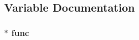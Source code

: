 \subsection{Variable Documentation}
\subsubsection[{\texorpdfstring{func}{func}}]{$\ast$ func}\hypertarget{group__apr__signal_gad33414172438284c8aa464d346294c6d}{}\label{group__apr__signal_gad33414172438284c8aa464d346294c6d}
